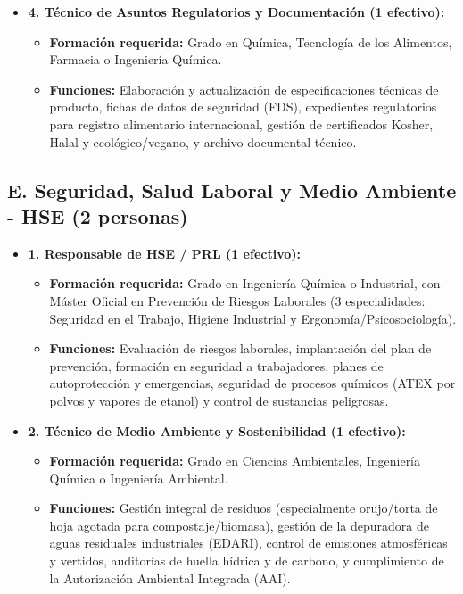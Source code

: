 \begin{itemize}[leftmargin=*]
    \item \textbf{4. Técnico de Asuntos Regulatorios y Documentación (1 efectivo):}
          \begin{itemize}
              \item \textbf{Formación requerida:} Grado en Química, Tecnología de los Alimentos, Farmacia o Ingeniería Química.
              \item \textbf{Funciones:} Elaboración y actualización de especificaciones técnicas de producto, fichas de datos de seguridad (FDS), expedientes regulatorios para registro alimentario internacional, gestión de certificados Kosher, Halal y ecológico/vegano, y archivo documental técnico.
          \end{itemize}
\end{itemize}

\subsection{E. Seguridad, Salud Laboral y Medio Ambiente - HSE (2 personas)}

\begin{itemize}[leftmargin=*]
    \item \textbf{1. Responsable de HSE / PRL (1 efectivo):}
          \begin{itemize}
              \item \textbf{Formación requerida:} Grado en Ingeniería Química o Industrial, con Máster Oficial en Prevención de Riesgos Laborales (3 especialidades: Seguridad en el Trabajo, Higiene Industrial y Ergonomía/Psicosociología).
              \item \textbf{Funciones:} Evaluación de riesgos laborales, implantación del plan de prevención, formación en seguridad a trabajadores, planes de autoprotección y emergencias, seguridad de procesos químicos (ATEX por polvos y vapores de etanol) y control de sustancias peligrosas.
          \end{itemize}

    \item \textbf{2. Técnico de Medio Ambiente y Sostenibilidad (1 efectivo):}
          \begin{itemize}
              \item \textbf{Formación requerida:} Grado en Ciencias Ambientales, Ingeniería Química o Ingeniería Ambiental.
              \item \textbf{Funciones:} Gestión integral de residuos (especialmente orujo/torta de hoja agotada para compostaje/biomasa), gestión de la depuradora de aguas residuales industriales (EDARI), control de emisiones atmosféricas y vertidos, auditorías de huella hídrica y de carbono, y cumplimiento de la Autorización Ambiental Integrada (AAI).
          \end{itemize}
\end{itemize}

